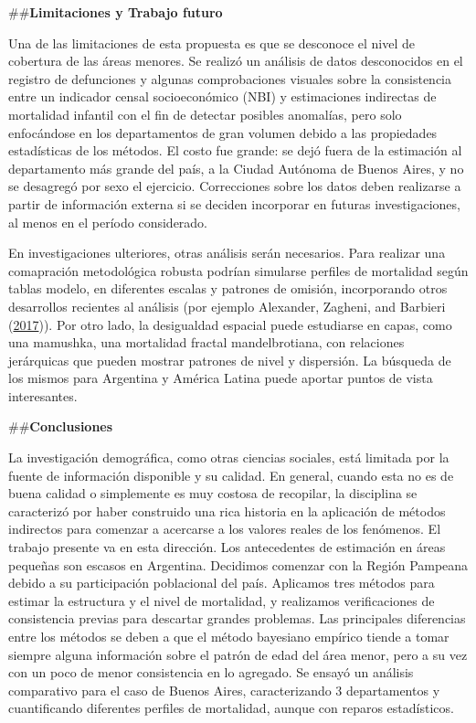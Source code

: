 \documentclass[12pt,]{article}
\begin{document}
\#\#\textbf{Limitaciones y Trabajo futuro}

Una de las limitaciones de esta propuesta es que se desconoce el nivel
de cobertura de las áreas menores. Se realizó un análisis de datos
desconocidos en el registro de defunciones y algunas comprobaciones
visuales sobre la consistencia entre un indicador censal socioeconómico
(NBI) y estimaciones indirectas de mortalidad infantil con el fin de
detectar posibles anomalías, pero solo enfocándose en los departamentos
de gran volumen debido a las propiedades estadísticas de los métodos. El
costo fue grande: se dejó fuera de la estimación al departamento más
grande del país, a la Ciudad Autónoma de Buenos Aires, y no se desagregó
por sexo el ejercicio. Correcciones sobre los datos deben realizarse a
partir de información externa si se deciden incorporar en futuras
investigaciones, al menos en el período considerado.

En investigaciones ulteriores, otras análisis serán necesarios. Para
realizar una comapración metodológica robusta podrían simularse perfiles
de mortalidad según tablas modelo, en diferentes escalas y patrones de
omisión, incorporando otros desarrollos recientes al análisis (por
ejemplo Alexander, Zagheni, and Barbieri
(\protect\hyperlink{ref-Alexander2017}{2017})). Por otro lado, la
desigualdad espacial puede estudiarse en capas, como una mamushka, una
mortalidad fractal mandelbrotiana, con relaciones jerárquicas que pueden
mostrar patrones de nivel y dispersión. La búsqueda de los mismos para
Argentina y América Latina puede aportar puntos de vista interesantes.

\#\#\textbf{Conclusiones}

La investigación demográfica, como otras ciencias sociales, está
limitada por la fuente de información disponible y su calidad. En
general, cuando esta no es de buena calidad o simplemente es muy costosa
de recopilar, la disciplina se caracterizó por haber construido una rica
historia en la aplicación de métodos indirectos para comenzar a
acercarse a los valores reales de los fenómenos. El trabajo presente va
en esta dirección. Los antecedentes de estimación en áreas pequeñas son
escasos en Argentina. Decidimos comenzar con la Región Pampeana debido a
su participación poblacional del país. Aplicamos tres métodos para
estimar la estructura y el nivel de mortalidad, y realizamos
verificaciones de consistencia previas para descartar grandes problemas.
Las principales diferencias entre los métodos se deben a que el método
bayesiano empírico tiende a tomar siempre alguna información sobre el
patrón de edad del área menor, pero a su vez con un poco de menor
consistencia en lo agregado. Se ensayó un análisis comparativo para el
caso de Buenos Aires, caracterizando 3 departamentos y cuantificando
diferentes perfiles de mortalidad, aunque con reparos estadísticos.
\end{document}
